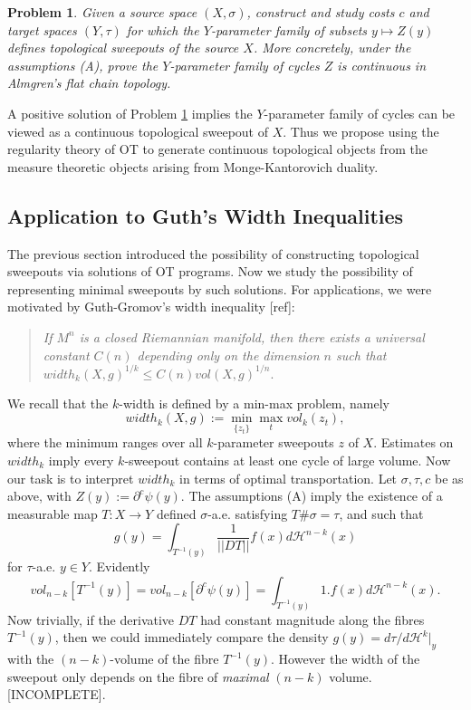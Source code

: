 \documentclass[12pt]{amsart}
\newtheorem{prob}{Problem}
\theoremstyle{remark}
\newcommand{\del}{\partial}
\newcommand{\sub}{\del^c \psi(y)}
\begin{document}
\begin{prob}
\label{alm}
Given a source space $(X, \sigma)$, construct and study costs $c$ and target spaces $(Y, \tau)$ for which the $Y$-parameter family of subsets $y\mapsto Z(y)$ defines topological sweepouts of the source $X$. More concretely, under the assumptions (A), prove the $Y$-parameter family of cycles $Z$ is continuous in Almgren's flat chain topology. 
\end{prob}

A positive solution of Problem \ref{alm} implies the $Y$-parameter family of cycles can be viewed as a continuous topological sweepout of $X$. Thus we propose using the regularity theory of OT to generate continuous topological objects from the measure theoretic objects arising from Monge-Kantorovich duality. 

\subsection{Application to Guth's Width Inequalities}

The previous section introduced the possibility of constructing topological sweepouts via solutions of OT programs. Now we study the possibility of representing minimal sweepouts by such solutions. For applications, we were motivated by Guth-Gromov's width inequality [ref]: 

\begin{quote} 
\emph{ If $M^n$ is a closed Riemannian manifold, then there exists a universal constant $C(n)$ depending only on the dimension $n$ such that $width_k(X,g)^{1/k}\leq C(n) vol(X,g)^{1/n}.$
} 
\end{quote} 

We recall that the $k$-width is defined by a min-max problem, namely $$width_k(X,g):=\min_{\{z_t\}} \max_{t} vol_k(z_t),$$ where the minimum ranges over all $k$-parameter sweepouts $z$ of $X$. Estimates on $width_k$ imply every $k$-sweepout contains at least one cycle of large volume. Now our task is to interpret $width_k$ in terms of optimal transportation.  Let $\sigma, \tau, c$ be as above, with $Z(y):=\sub$. The assumptions (A) imply the existence of a measurable map $T: X\to Y$ defined $\sigma$-a.e. satisfying $T\# \sigma = \tau$, and such that $$g(y)=\int_{T^{-1}(y)} \frac{1}{||DT||} f(x) d\mathscr{H}^{n-k}(x) $$ for $\tau$-a.e. $y\in Y$. Evidently $$vol_{n-k}[T^{-1}(y)]=vol_{n-k} [\sub]=\int_{T^{-1}(y)} 1 . f(x) d\mathscr{H}^{n-k}(x).$$ Now trivially, if the derivative $DT$ had constant magnitude along the fibres $T^{-1}(y)$, then we could immediately compare the density $g(y)=d\tau/d\mathscr{H}^{k}|_y$ with the $(n-k)$-volume of the fibre $T^{-1}(y)$. However the width of the sweepout only depends on the fibre of \emph{maximal} $(n-k)$ volume. [INCOMPLETE].
\end{document}
